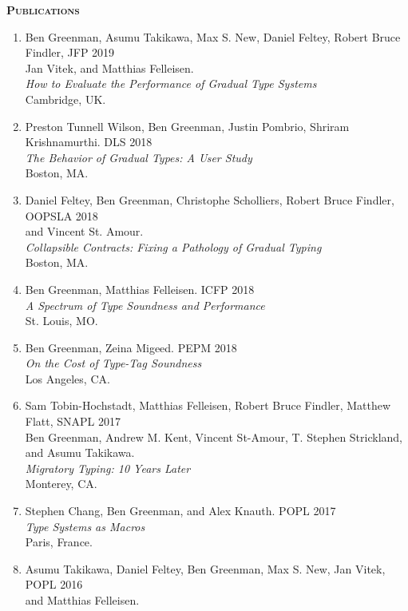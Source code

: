 \documentclass{article}
\newcommand{\mysection}[1]{\vspace{0.5cm}
\hspace{-1.3cm}\textsc{\textbf{#1}}~\hrulefill}
\begin{document}
\mysection{Publications}
\begin{enumerate}
\item
  Ben Greenman, Asumu Takikawa, Max S. New, Daniel Feltey, Robert Bruce Findler, \hfill JFP 2019 \\
  Jan Vitek, and Matthias Felleisen. \\
  \emph{How to Evaluate the Performance of Gradual Type Systems} \\
  Cambridge, UK.
\item
  Preston Tunnell Wilson, Ben Greenman, Justin Pombrio, Shriram Krishnamurthi. \hfill DLS 2018 \\
  \emph{The Behavior of Gradual Types: A User Study} \\
  Boston, MA.
\item
  Daniel Feltey, Ben Greenman, Christophe Scholliers, Robert Bruce Findler, \hfill OOPSLA 2018 \\
  and Vincent St. Amour. \\
  \emph{Collapsible Contracts: Fixing a Pathology of Gradual Typing} \\
  Boston, MA.
\item
  Ben Greenman, Matthias Felleisen. \hfill ICFP 2018 \\
  \emph{A Spectrum of Type Soundness and Performance} \\
  St. Louis, MO.
\item
  Ben Greenman, Zeina Migeed. \hfill PEPM 2018 \\
  \emph{On the Cost of Type-Tag Soundness} \\
  Los Angeles, CA.
\item
  Sam Tobin-Hochstadt, Matthias Felleisen, Robert Bruce Findler, Matthew Flatt, \hfill SNAPL 2017 \\
  Ben Greenman, Andrew M. Kent, Vincent St-Amour, T. Stephen Strickland, \\
  and Asumu Takikawa. \\
  \emph{Migratory Typing: 10 Years Later} \\
  Monterey, CA.
\item
  Stephen Chang, Ben Greenman, and Alex Knauth. \hfill POPL 2017 \\
   \emph{Type Systems as Macros} \\
  Paris, France.
\item
  Asumu Takikawa, Daniel Feltey, Ben Greenman, Max S. New, Jan Vitek, \hfill POPL 2016 \\
   and Matthias Felleisen. \\

\end{enumerate}
\end{document}
